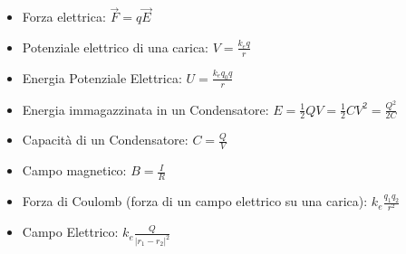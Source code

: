 \documentclass{article}
\begin{document}
\begin{itemize}
    \item Forza elettrica: $\overrightarrow{F}=q\overrightarrow{E}$
    \item Potenziale elettrico di una carica: $V=\frac{k_eq}{r}$
    \item Energia Potenziale Elettrica: $U=\frac{k_eq_0q}{r}$
\end{itemize}

\begin{itemize}
    \item Energia immagazzinata in un Condensatore: $E=\frac{1}{2}QV=\frac{1}{2}CV^2=\frac{Q^2}{2C}$
    \item Capacità di un Condensatore: $C=\frac{Q}{V}$
    \item Campo magnetico: $B=\frac{I}{R}$
\end{itemize}

\begin{itemize}
    \item Forza di Coulomb (forza di un campo elettrico su una carica): $k_e\frac{q_1q_2}{r^2}$
    \item Campo Elettrico: $k_e\frac{Q}{|r_1-r_2|^2}$
    
\end{itemize}
\end{document}
